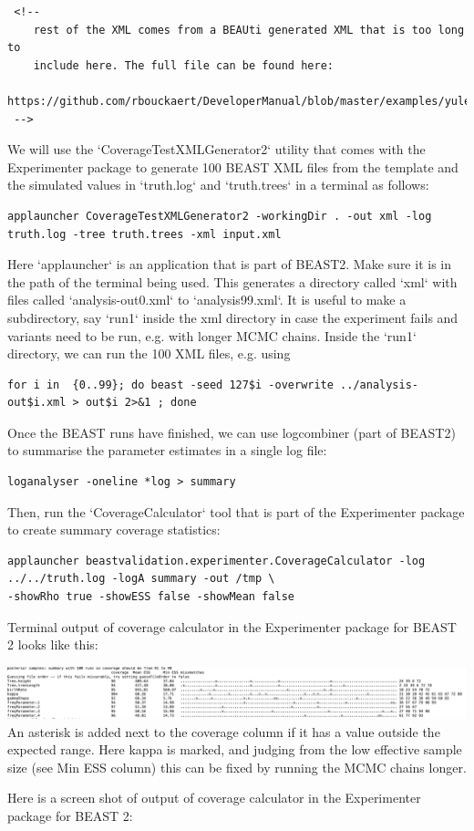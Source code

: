 \documentclass[oneside]{article}
\begin{document}
{\begin{lstlisting}
 <!--
 	rest of the XML comes from a BEAUti generated XML that is too long to
 	include here. The full file can be found here:
	https://github.com/rbouckaert/DeveloperManual/blob/master/examples/yule/input.xml
 -->

\end{lstlisting}
}

We will use the `CoverageTestXMLGenerator2` utility that comes with the Experimenter package to generate 100 BEAST XML files from the template and the simulated values in `truth.log` and `truth.trees` in a terminal as follows:

{\scriptsize
\begin{lstlisting}
applauncher CoverageTestXMLGenerator2 -workingDir . -out xml -log truth.log -tree truth.trees -xml input.xml 
\end{lstlisting}
}

Here `applauncher` is an application that is part of BEAST2. Make sure it is in the path of the terminal being used.
This generates a directory called `xml` with files called `analysis-out0.xml` to `analysis99.xml`.
It is useful to make a subdirectory, say `run1` inside the xml directory in case the experiment fails and variants need to be run, e.g. with longer MCMC chains.
Inside the `run1` directory, we can run the 100 XML files, e.g. using

{\scriptsize
\begin{lstlisting}
for i in  {0..99}; do beast -seed 127$i -overwrite ../analysis-out$i.xml > out$i 2>&1 ; done 
\end{lstlisting}
}

Once the BEAST runs have finished, we can use logcombiner (part of BEAST2) to summarise the parameter estimates in a single log file:

{\scriptsize
\begin{lstlisting}
loganalyser -oneline *log > summary
\end{lstlisting}
}

Then, run the `CoverageCalculator` tool that is part of the Experimenter package to create summary coverage statistics:

{\scriptsize
\begin{lstlisting}
applauncher beastvalidation.experimenter.CoverageCalculator -log ../../truth.log -logA summary -out /tmp \
-showRho true -showESS false -showMean false 
\end{lstlisting}
}

   {Terminal output of coverage calculator in the Experimenter package for BEAST 2 looks like this:
   
   \includegraphics[width=\textwidth]{../figures/coveragecalculator0.png}
   An asterisk is added next to the coverage column if it has a value outside the expected range.
   Here kappa is marked, and judging from the low effective sample size (see Min ESS column) this can be fixed by running the MCMC chains longer.}
Here is a screen shot of output of coverage calculator in the Experimenter package for BEAST 2:
\end{document}
